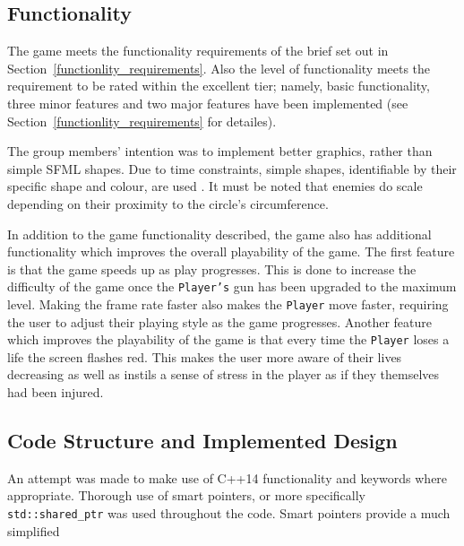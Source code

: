 \documentclass[10pt,twocolumn]{witseiepaper}
\begin{document}
\subsection{Functionality}

The game meets the functionality requirements of the brief set out in Section~\ref{functionlity_requirements}. Also the level of functionality meets the requirement to be rated within the excellent tier; namely, basic functionality, three minor features and two major features have been implemented (see Section~\ref{functionlity_requirements} for detailes). 

The group members' intention was to implement better graphics, rather than simple SFML shapes. Due to time constraints, simple shapes, identifiable by their specific shape and colour, are used . It must be noted that enemies do scale depending on their proximity to the circle's circumference.

In addition to the game functionality described, the game also has additional functionality which improves the overall playability of the game. The first feature is that the game speeds up as play progresses. This is done to increase the difficulty of the game once the \texttt{Player's} gun has been upgraded to the maximum level. Making the frame rate faster also makes the \texttt{Player} move faster, requiring the user to adjust their playing style as the game progresses. Another feature which improves the playability of the game is that every time the \texttt{Player} loses a life the screen flashes red. This makes the user more aware of their lives decreasing as well as instils a sense of stress in the player as if they themselves had been injured. 

\subsection{Code Structure and Implemented Design}\label{critical_code_structure}

An attempt was made to make use of C++14 functionality and keywords where appropriate. Thorough use of smart pointers, or more specifically \texttt{std::shared\_ptr} was used throughout the code. Smart pointers provide a much simplified 

\end{document}

